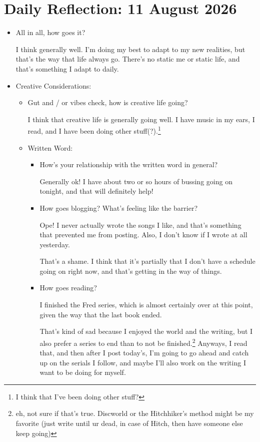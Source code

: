 \documentclass[12pt]{article}
\renewcommand{\,}{\textsuperscript{,}}
\newcommand{\dailyreflect}[1]{\section{Daily Reflection: #1}}
\begin{document}
\dailyreflect{11 August 2026}  
\begin{itemize}  
 \item All in all, how goes it?

I think generally well. I'm doing my best to adapt to my new realities, but that's the way that life always go.  
There's no static me or static life, and that's something I adapt to daily.

 \item Creative Considerations:  
 \begin{itemize}  
 \item Gut and / or vibes check, how is creative life going?

I think that creative life is generally going well. I have music in my ears, I read, and I have been doing other stuff(?).\footnote{I think that I've been doing other stuff?}

 \item Written Word:  
 \begin{itemize}  
 \item How's your relationship with the written word in general?

Generally ok! I have about two or so hours of bussing going on tonight, and that will definitely help!

\item How goes blogging? What's feeling like the barrier?

Ope! I never actually wrote the songs I like, and that's something that prevented me from posting.  
Also, I don't know if I wrote at all yesterday.

That's a shame.  
I think that it's partially that I don't have a schedule going on right now, and that's getting in the way of things.

\item How goes reading?

I finished the Fred series, which is almost certainly over at this point, given the way that the last book ended.

That's kind of sad because I enjoyed the world and the writing, but I also prefer a series to end than to not be finished.\footnote{eh, not sure if that's true. Discworld or the Hitchhiker's method might be my favorite (just write until ur dead, in case of Hitch, then have someone else keep going)}  
Anyways, I read that, and then after I post today's, I'm going to go ahead and catch up on the serials I follow, and maybe I'll also work on the writing I want to be doing for myself.


\end{itemize}
\end{itemize}
\end{itemize}
\end{document}
